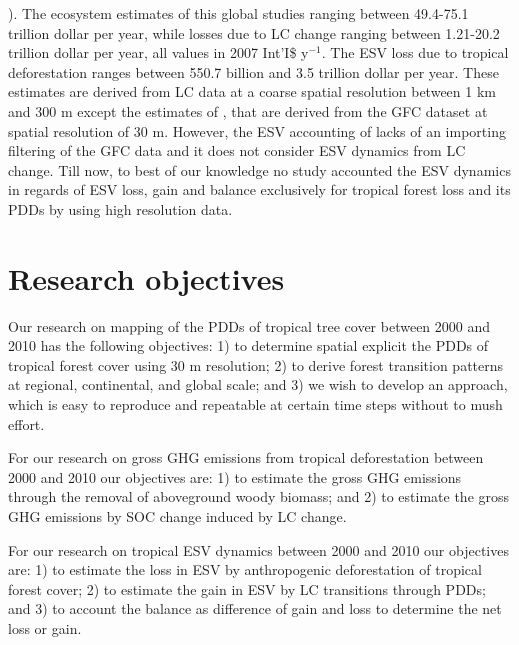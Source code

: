 \citet{Costanza1997,Costanza2014,Sannigrahi2018,Song2018}). The ecosystem estimates of this global studies ranging between 49.4-75.1 trillion dollar per year, while losses due to \ac{LC} change ranging between 1.21-20.2 trillion dollar per year, all values in 2007 Int'I\$ y$^{-1}$. The \ac{ESV} loss due to tropical deforestation ranges between 550.7 billion and 3.5 trillion dollar per year. These estimates are derived from \ac{LC} data at a coarse spatial resolution between 1 km and 300 m except the estimates of \citeauthor{Song2018}, that are derived from the \ac{GFC} dataset at spatial resolution of 30 m. However, the \ac{ESV} accounting of \citeauthor{Song2018} lacks of an importing filtering of the \ac{GFC} data and it does not consider \ac{ESV} dynamics from \ac{LC} change. Till now, to best of our knowledge no study accounted the \ac{ESV} dynamics in regards of \ac{ESV} loss, gain and balance exclusively for tropical forest loss and its \acp{PDD} by using high resolution data. 

	\section{Research objectives}
		Our research on mapping of the \acp{PDD} of tropical tree cover between 2000 and 2010 has the following objectives: 1) to determine spatial explicit the \acp{PDD} of tropical forest cover using 30 m resolution; 2) to derive forest transition patterns at regional, continental, and global scale; and 3) we wish to develop an approach, which is easy to reproduce and repeatable at certain time steps without to mush effort.

		For our research on gross \ac{GHG} emissions from tropical deforestation between 2000 and 2010 our objectives are: 1) to estimate the gross \ac{GHG} emissions through the removal of aboveground woody biomass; and 2) to estimate the gross \ac{GHG} emissions by \ac{SOC} change induced by \ac{LC} change.

		For our research on tropical \ac{ESV} dynamics between 2000 and 2010 our objectives are: 1) to estimate the loss in \ac{ESV} by anthropogenic deforestation of tropical forest cover; 2) to estimate the gain in \ac{ESV} by \ac{LC} transitions through \acp{PDD}; and 3) to account the balance as difference of gain and loss to determine the net loss or gain.